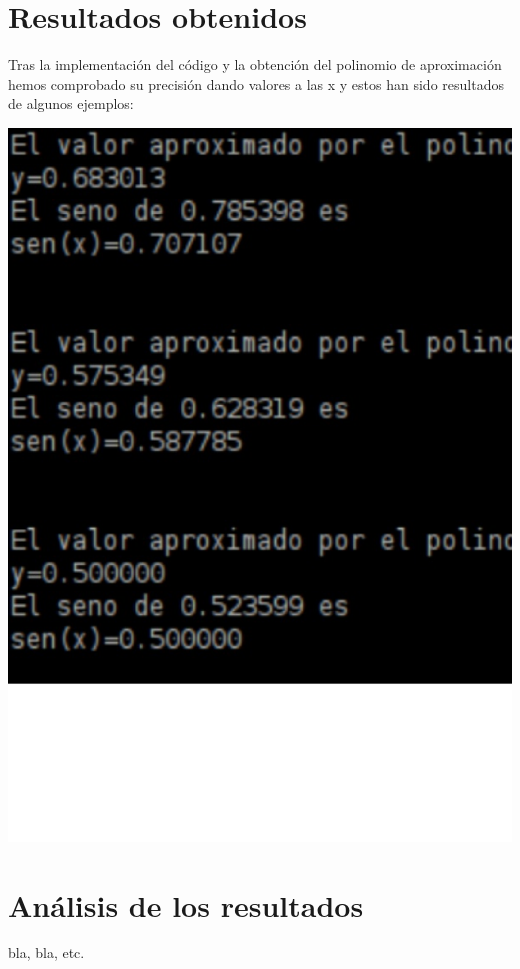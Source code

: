 \section{Resultados obtenidos}
\label{3:sec:3}
Tras la implementación del código y la obtención del polinomio de aproximación hemos comprobado su precisión dando valores a las x y estos han sido resultados de algunos ejemplos:
\vspace{1.5 true cm}

\includegraphics[scale=0.38]{images/comprobacion.eps}

\section{Análisis de los resultados}
\label{3:sec:4}

bla, bla, etc. 

